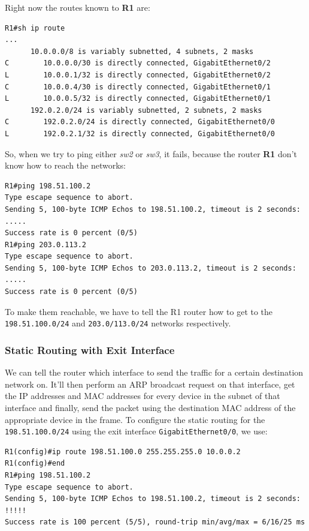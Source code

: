 \noindent
Right now the routes known to \textbf{R1} are:

\vspace{-15pt}
\begin{verbatim}
R1#sh ip route
...
      10.0.0.0/8 is variably subnetted, 4 subnets, 2 masks
C        10.0.0.0/30 is directly connected, GigabitEthernet0/2
L        10.0.0.1/32 is directly connected, GigabitEthernet0/2
C        10.0.0.4/30 is directly connected, GigabitEthernet0/1
L        10.0.0.5/32 is directly connected, GigabitEthernet0/1
      192.0.2.0/24 is variably subnetted, 2 subnets, 2 masks
C        192.0.2.0/24 is directly connected, GigabitEthernet0/0
L        192.0.2.1/32 is directly connected, GigabitEthernet0/0
\end{verbatim}
\vspace{-10pt}

\noindent
So, when we try to ping either \textit{sw2} or \textit{sw3}, it fails, because the router \textbf{R1} don't know how to reach the networks: 

\vspace{-15pt}
\begin{verbatim}
R1#ping 198.51.100.2
Type escape sequence to abort.
Sending 5, 100-byte ICMP Echos to 198.51.100.2, timeout is 2 seconds:
.....
Success rate is 0 percent (0/5)
R1#ping 203.0.113.2 
Type escape sequence to abort.
Sending 5, 100-byte ICMP Echos to 203.0.113.2, timeout is 2 seconds:
.....
Success rate is 0 percent (0/5)
\end{verbatim}
\vspace{-10pt}

\noindent
To make them reachable, we have to tell the R1 router how to get to the \verb|198.51.100.0/24| and \verb|203.0/113.0/24| networks respectively.

\subsubsection{Static Routing with Exit Interface}
We can tell the router which interface to send the traffic for a certain destination network on. It'll then perform an ARP broadcast request on that interface, get the IP addresses and MAC addresses for every device in the subnet of that interface and finally, send the packet using the destination MAC address of the appropriate device in the frame. To configure the static routing for the \verb|198.51.100.0/24| using the exit interface \verb|GigabitEthernet0/0|, we use:

\vspace{-15pt}
\begin{verbatim}
R1(config)#ip route 198.51.100.0 255.255.255.0 10.0.0.2
R1(config)#end
R1#ping 198.51.100.2
Type escape sequence to abort.
Sending 5, 100-byte ICMP Echos to 198.51.100.2, timeout is 2 seconds:
!!!!!
Success rate is 100 percent (5/5), round-trip min/avg/max = 6/16/25 ms
\end{verbatim}
\vspace{-10pt}

